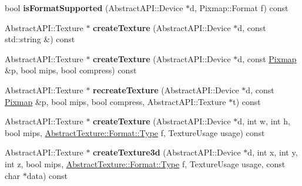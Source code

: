 \begin{DoxyCompactItemize}
\item 
\hypertarget{class_tempest_1_1_direct_x9_a49045887af02ebb3a5aae52bd960beef}{bool {\bfseries is\+Format\+Supported} (Abstract\+A\+P\+I\+::\+Device $\ast$d, Pixmap\+::\+Format f) const }\label{class_tempest_1_1_direct_x9_a49045887af02ebb3a5aae52bd960beef}

\item 
\hypertarget{class_tempest_1_1_direct_x9_ad32422a654596592d2c5b8d63c15142a}{Abstract\+A\+P\+I\+::\+Texture $\ast$ {\bfseries create\+Texture} (Abstract\+A\+P\+I\+::\+Device $\ast$d, const std\+::string \&) const }\label{class_tempest_1_1_direct_x9_ad32422a654596592d2c5b8d63c15142a}

\item 
\hypertarget{class_tempest_1_1_direct_x9_a41ad54ef6d1f2ca4d9ef79247e65f254}{Abstract\+A\+P\+I\+::\+Texture $\ast$ {\bfseries create\+Texture} (Abstract\+A\+P\+I\+::\+Device $\ast$d, const \hyperlink{class_tempest_1_1_pixmap}{Pixmap} \&p, bool mips, bool compress) const }\label{class_tempest_1_1_direct_x9_a41ad54ef6d1f2ca4d9ef79247e65f254}

\item 
\hypertarget{class_tempest_1_1_direct_x9_a4bdf71403bd6227012136371a8c9be73}{Abstract\+A\+P\+I\+::\+Texture $\ast$ {\bfseries recreate\+Texture} (Abstract\+A\+P\+I\+::\+Device $\ast$d, const \hyperlink{class_tempest_1_1_pixmap}{Pixmap} \&p, bool mips, bool compress, Abstract\+A\+P\+I\+::\+Texture $\ast$t) const }\label{class_tempest_1_1_direct_x9_a4bdf71403bd6227012136371a8c9be73}

\item 
\hypertarget{class_tempest_1_1_direct_x9_a1267863a3f48d9013b3b20bdcd762813}{Abstract\+A\+P\+I\+::\+Texture $\ast$ {\bfseries create\+Texture} (Abstract\+A\+P\+I\+::\+Device $\ast$d, int w, int h, bool mips, \hyperlink{struct_tempest_1_1_abstract_texture_1_1_format_a231a1f516e53783bf72c713669b115b3}{Abstract\+Texture\+::\+Format\+::\+Type} f, Texture\+Usage usage) const }\label{class_tempest_1_1_direct_x9_a1267863a3f48d9013b3b20bdcd762813}

\item 
\hypertarget{class_tempest_1_1_direct_x9_aa971fa161847139b19e21fc0a06cffae}{Abstract\+A\+P\+I\+::\+Texture $\ast$ {\bfseries create\+Texture3d} (Abstract\+A\+P\+I\+::\+Device $\ast$d, int x, int y, int z, bool mips, \hyperlink{struct_tempest_1_1_abstract_texture_1_1_format_a231a1f516e53783bf72c713669b115b3}{Abstract\+Texture\+::\+Format\+::\+Type} f, Texture\+Usage usage, const char $\ast$data) const }\label{class_tempest_1_1_direct_x9_aa971fa161847139b19e21fc0a06cffae}


\end{DoxyCompactItemize}

